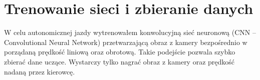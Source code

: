 \chapter{Trenowanie sieci i zbieranie danych}
W celu autonomicznej jazdy wytrenowałem konwolucyjną sieć neuronową (CNN -- Convolutional Neural Network)
przetwarzającą obraz z kamery bezpośrednio w porządaną prędkość liniową
oraz obrotową. Takie podejście pozwala szybko zbierać dane uczące. Wystarczy
tylko nagrać obraz z kamery oraz prędkość nadaną przez kierowcę.
\begin{figure}[h]
  \centering
\end{figure}
